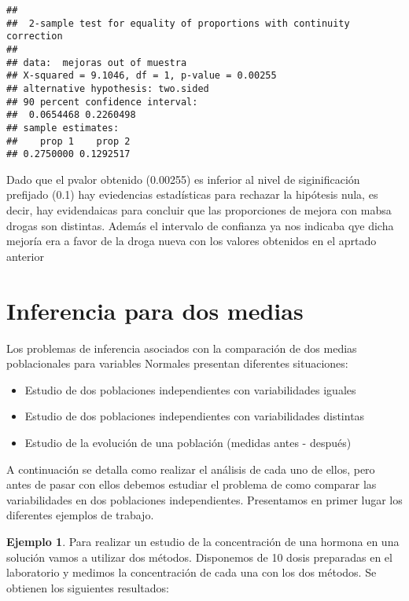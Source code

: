 \documentclass[
]{book}
\providecommand{\tightlist}{%
  \setlength{\itemsep}{0pt}\setlength{\parskip}{0pt}}
\begin{document}
\begin{verbatim}
## 
##  2-sample test for equality of proportions with continuity correction
## 
## data:  mejoras out of muestra
## X-squared = 9.1046, df = 1, p-value = 0.00255
## alternative hypothesis: two.sided
## 90 percent confidence interval:
##  0.0654468 0.2260498
## sample estimates:
##    prop 1    prop 2 
## 0.2750000 0.1292517
\end{verbatim}

Dado que el pvalor obtenido (0.00255) es inferior al nivel de siginificación prefijado (0.1) hay eviedencias estadísticas para rechazar la hipótesis nula, es decir, hay evidendaicas para concluir que las proporciones de mejora con mabsa drogas son distintas. Además el intervalo de confianza ya nos indicaba qye dicha mejoría era a favor de la droga nueva con los valores obtenidos en el aprtado anterior

\hypertarget{inferencia-para-dos-medias}{%
\section{Inferencia para dos medias}\label{inferencia-para-dos-medias}}

Los problemas de inferencia asociados con la comparación de dos medias poblacionales para variables Normales presentan diferentes situaciones:

\begin{itemize}
\tightlist
\item
  Estudio de dos poblaciones independientes con variabilidades iguales
\item
  Estudio de dos poblaciones independientes con variabilidades distintas
\item
  Estudio de la evolución de una población (medidas antes - después)
\end{itemize}

A continuación se detalla como realizar el análisis de cada uno de ellos, pero antes de pasar con ellos debemos estudiar el problema de como comparar las variabilidades en dos poblaciones independientes. Presentamos en primer lugar los diferentes ejemplos de trabajo.

\textbf{Ejemplo 1}. Para realizar un estudio de la concentración de una hormona en una solución vamos a utilizar dos métodos. Disponemos de 10 dosis preparadas en el laboratorio y medimos la concentración de cada una con los dos métodos. Se obtienen los siguientes resultados:
\end{document}
